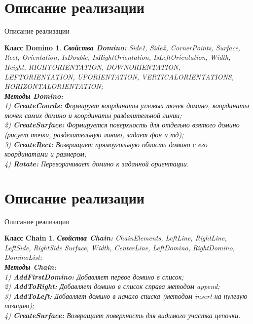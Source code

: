 \documentclass[handout]{beamer}
\newtheorem*{classes2}{Класс Domino}
\newtheorem*{classes3}{Класс Chain}
\begin{document}
  	\section{Описание реализации}
  \begin{frame}{Описание реализации}	
  	\begin{classes2}
  	 \textbf{Свойства Domino:} Side1, Side2, CornerPoints, Surface, Rect, Orientation, IsDouble, IsRightOrientation, IsLeftOrientation, Width, Height, RIGHTORIENTATION, DOWNORIENTATION,  LEFTORIENTATION, UPORIENTATION, VERTICALORIENTATIONS, HORIZONTALORIENTATION;\\
  	  \textbf{Методы Domino:}\\
  	  1) \textbf{CreateCoords:} Формирует координаты угловых точек домино, координаты точек самих домино и координаты разделительной линии;\\
  	  2) \textbf{CreateSurface:} Формируется поверхность для отдельно взятого домино (рисует точки, разделительную линию, задает фон и тд);\\
  	  3) \textbf{CreateRect:} Возвращает прямоугольную область домино с его координатами и размером;\\
  	  4) \textbf{Rotate:} Переворачивает домино к заданной ориентации.\\
  		
  	\end{classes2}
  \end{frame}


	\section{Описание реализации}
\begin{frame}{Описание реализации}	
	\begin{classes3}
		\textbf{Свойства Chain:} ChainElements, LeftLine, RightLine, LeftSide, RightSide Surface, Width, CenterLine, LeftDomino, RightDomino, DominoList;\\
		\textbf{Методы Chain:} \\
		1) \textbf{AddFirstDomino:} Добавляет первое домино в список;\\
		2) \textbf{AddToRight:} Добавляет домино в список справа методом append;\\
		3) \textbf{AddToLeft:} Добавляет домино в начало списка (методом insert на нулевую позицию);\\
		4) \textbf{CreateSurface:} Возвращает поверхность для видимого участка цепочки.\\
		
	\end{classes3}
\end{frame}
\end{document}
